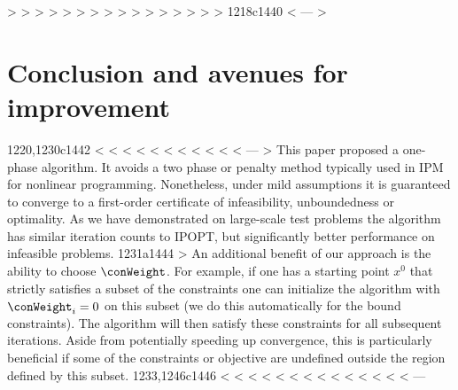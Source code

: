 > 
> 
> %
> %
> %
> %
> %
> %
> %
> %
> %
> %
> %
> %
> %
> %
1218c1440
< %
---
> \section{Conclusion and avenues for improvement}
1220,1230c1442
< %
< %
< %
< %
< %
< %
< %
< %
< %
< %
< %
---
> This paper proposed a one-phase algorithm. It avoids a two phase or penalty method typically used in IPM for nonlinear programming. Nonetheless, under mild assumptions it is guaranteed to converge to a first-order certificate of infeasibility, unboundedness or optimality. As we have demonstrated on large-scale test problems the algorithm has similar iteration counts to IPOPT, but significantly better performance on infeasible problems. 
1231a1444
> An additional benefit of our approach is the ability to choose $\conWeight$. For example, if one has a starting point $x^0$ that strictly satisfies a subset of the constraints one can initialize the algorithm with $\conWeight_i = 0$ on this subset (we do this automatically for the bound constraints). The algorithm will then satisfy these constraints for all subsequent iterations. Aside from potentially speeding up convergence, this is particularly beneficial if some of the constraints or objective are undefined outside the region defined by this subset.
1233,1246c1446
< %
< %
< %
< %
< %
< %
< %
< %
< %
< %
< %
< %
< %
< %
---
